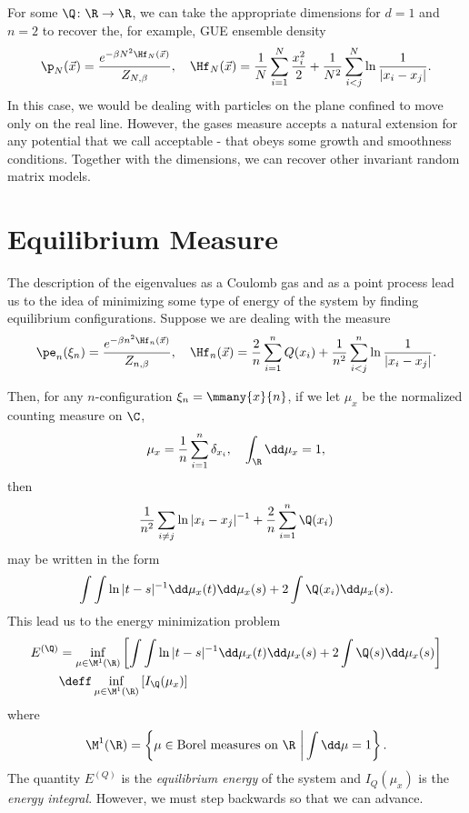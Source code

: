 \begin{exemplo}
	For some $\Q \colon \R \rightarrow \R$, we can take the appropriate dimensions for $d=1$ and $n = 2$ to recover the, for example, GUE ensemble density
	\begin{equation}
		\p_N(\vec{x}) = \frac{e^{-\beta N^2 \Hf_N(\vec{x})}}{Z_{N,\beta}}, \quad \Hf_N(\vec{x}) = \frac{1}{N} \sum_{i = 1}^{N} \frac{x_i^2}{2} + \frac{1}{N^2} \sum_{i < j}^{N} \ln{\frac{1}{|x_i - x_j|}}.
	\end{equation}
	In this case, we would be dealing with particles on the plane confined to move only on the real line. However, the gases measure accepts a natural extension for any potential that we call acceptable - that obeys some growth and smoothness conditions. Together with the dimensions, we can recover other invariant random matrix models.
\end{exemplo}

\section{Equilibrium Measure}
\label{Section: Equilibrium}

The description of the eigenvalues as a Coulomb gas and as a point process lead us to the idea of minimizing some type of energy of the system by finding equilibrium configurations. Suppose we are dealing with the measure
\begin{equation}
	\pe_n(\xi_n) = \frac{e^{-\beta n^2 \Hf_n(\vec{x})}}{Z_{n,\beta}}, \quad \Hf_n(\vec{x}) = \frac{2}{n} \sum_{i = 1}^{n} Q(x_i) + \frac{1}{n^2} \sum_{i < j}^{n} \ln{\frac{1}{|x_i - x_j|}}. 
\end{equation}

Then, for any $n$-configuration $\xi_n = \mmany{x}{n}$, if we let $\mu_x$ be the normalized counting measure on $\C$,
\begin{equation}
	\mu_x = \frac{1}{n} \sum_{i=1}^{n} \delta_{x_i}, \quad \int_{\R} \dd \mu_x = 1,
 \end{equation} 
 then
\begin{equation}
	\frac{1}{n^2} \sum_{i\neq j} \ln{|x_i - x_j|^{-1}} + \frac{2}{n} \sum_{i=1}^n \Q(x_i)
\end{equation}
may be written in the form 
\begin{equation}
	\int \int \ln |t - s|^{-1} \dd \mu_x(t) \dd \mu_x(s) + 2 \int \Q(x_i) \dd  \mu_x (s).
\end{equation}
This lead us to the energy minimization problem 
\begin{align}
	E^{(\Q)} & = \inf_{\mu \in \M^1(\R)} \left[ \int \int \ln |t - s|^{-1} \dd \mu_x(t) \dd \mu_x(s) + 2 \int \Q(s) \dd  \mu_x (s) \right] \\\ & \deff \inf_{\mu \in \M^1(\R)} \left[ I_\Q(\mu_x) \right]
\end{align}
where
\begin{equation}
	\M^1(\R) = \left\{ \mu \in \text{Borel measures on} \ \R \ \bigg| \int \dd \mu = 1 \right\}.
\end{equation}
The quantity $E^{(Q)}$ is the \textit{equilibrium energy} of the system and $I_Q(\mu_x)$ is the \textit{energy integral}. However, we must step backwards so that we can advance.

